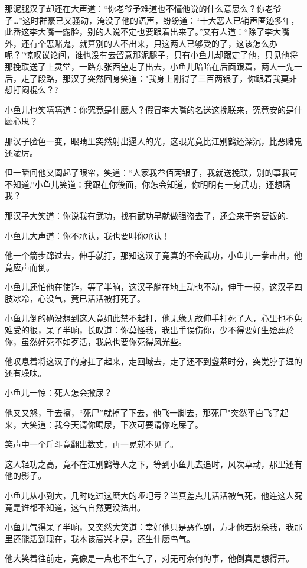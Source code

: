 \documentclass[12pt,oneside]{book}
\begin{document}
那泥腿汉子却还在大声道：``你老爷予难道也不懂他说的什么意思么？你老爷子\ldots{}''这时群豪已又骚动，淹没了他的语声，纷纷道：``十大恶人已销声匿迹多年，此番这李大嘴一露脸，别的人说不定也要跟着出来了。''又有人道：``除了李大嘴外，还有个恶赌鬼，就算别的人不出来，只这两人已够受的了，这该怎么办呢？''惊叹议论间，谁也没有去留意那泥腿子，只有小鱼儿却跟定了他，只见他将那挽联送了上灵堂，一路东张西望走了出去，小鱼儿暗暗在后面跟着，两人一先一后，走了段路，那汉子突然回身笑道："我身上刚得了三百两银子，你跟着我莫非想打闷棍么？?

小鱼儿也笑嘻嘻道：你究竟是什麽人？假冒李大嘴的名送这挽联来，究竟安的是什麽心思？

那汉子脸色一变，眼睛里突然射出逼人的光，这眼光竟比江别鹤还深沉，比恶赌鬼还凌厉。

但一瞬间他又阖起了眼帘，笑道：``人家我叁佰两银子，我就送挽联，别的事我可不知道.''小鱼儿笑道：我跟在你後面，你怎会知道，你明明有一身武功，还想瞒我？

那汉子大笑道：你说我有武功，找有武功早就做强盗去了，还会来干穷要饭的.

小鱼儿大声道：你不承认，我也要叫你承认！

他一个箭步蹿过去，伸手就打，那知这汉子竟真的不会武功，小鱼儿一拳击出，他竟应声而倒。

小鱼儿还怕他在使诈，等了半晌，这汉子躺在地上动也不动，伸手一摸，这汉子四肢冰冷，心没气，竟已活活被打死了。

小鱼儿倒的确没想到这人竟如此禁不起打，他无缘无故伸手打死了人，心里也不免难受的很，呆了半晌，长叹道：你莫怪我，我出手误伤你，少不得要好生殓葬於你，虽然好死不如歹活，我总也要你死得风光些。

他叹息着将这汉子的身扛了起来，走回城去，走了还不到盏茶时分，突觉脖子湿的还有臊味。

小鱼儿一惊：死人怎会撒尿？

他又又怒，手去擦，``死尸''就掉了下去，他飞一脚去，那死尸"突然平白飞了起来，大笑道：我今天请你喝尿，下次可要请你吃屎了。

笑声中一个斤斗竟翻出数丈，再一晃就不见了。

这人轻功之高，竟不在江别鹤等人之下，等到小鱼儿去追时，风次草动，那里还有他的影子。

小鱼儿从小到大，几时吃过这麽大的哑吧亏？当真差点儿活活被气死，他连这人究竟是谁都不知道，这气自然更没法出。

小鱼儿气得呆了半晌，又突然大笑道：幸好他只是恶作剧，方才他若想杀我，我那里还能活到现在，我本该高兴才是，还生什麽鸟气。

他大笑着往前走，竟像是一点也不生气了，对无可奈何的事，他倒真是想得开。
\end{document}

